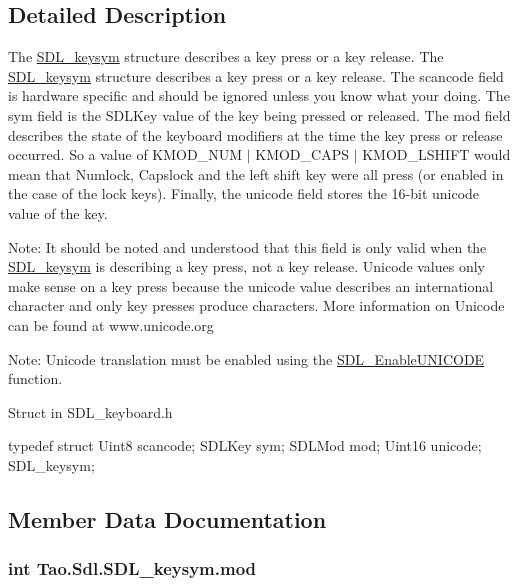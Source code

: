 \subsection{Detailed Description}
The \hyperlink{struct_tao_1_1_sdl_1_1_s_d_l__keysym}{SDL\_\-keysym} structure describes a key press or a key release. The \hyperlink{struct_tao_1_1_sdl_1_1_s_d_l__keysym}{SDL\_\-keysym} structure describes a key press or a key release. The scancode field is hardware specific and should be ignored unless you know what your doing. The sym field is the SDLKey value of the key being pressed or released. The mod field describes the state of the keyboard modifiers at the time the key press or release occurred. So a value of KMOD\_\-NUM $|$ KMOD\_\-CAPS $|$ KMOD\_\-LSHIFT would mean that Numlock, Capslock and the left shift key were all press (or enabled in the case of the lock keys). Finally, the unicode field stores the 16-\/bit unicode value of the key. 

Note: It should be noted and understood that this field is only valid when the \hyperlink{struct_tao_1_1_sdl_1_1_s_d_l__keysym}{SDL\_\-keysym} is describing a key press, not a key release. Unicode values only make sense on a key press because the unicode value describes an international character and only key presses produce characters. More information on Unicode can be found at www.unicode.org 

Note: Unicode translation must be enabled using the \hyperlink{_sdl_8cs_a84ff6db83e36f31aa5b5643cc18b1364}{SDL\_\-EnableUNICODE} function.  

Struct in SDL\_\-keyboard.h 
\begin{DoxyCode}
                typedef struct{
                        Uint8 scancode;
                        SDLKey sym;
                        SDLMod mod;
                        Uint16 unicode;
                } SDL_keysym;
\end{DoxyCode}
 

\subsection{Member Data Documentation}
\hypertarget{struct_tao_1_1_sdl_1_1_s_d_l__keysym_a8588d3a5bd0f8a8af5f1618fdfc6251f}{
\subsubsection[{mod}]{\setlength{\rightskip}{0pt plus 5cm}int {\bf Tao.Sdl.SDL\_\-keysym.mod}}}
\label{struct_tao_1_1_sdl_1_1_s_d_l__keysym_a8588d3a5bd0f8a8af5f1618fdfc6251f}


